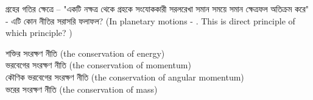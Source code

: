 \documentclass[addpoints]{exam}
\begin{document}
\begin{questions}
\begin{oneparchoices}
\end{oneparchoices}

\question  গ্রহের গতির ক্ষেত্রে – "একটি নক্ষত্র থেকে গ্রহকে সংযোককারী সরলরেখা সমান সময়ে সমান ক্ষেত্রফল অতিক্রম করে" - এটি কোন নীতির সরাসরি ফলাফল? (In planetary motions - . This is direct principle of which principle? )

\begin{oneparchoices}
\choice শক্তির সংরক্ষণ নীতি (the conservation of energy)\\
\choice ভরবেগের সংরক্ষণ নীতি (the conservation of momentum) \\
\choice কৌণিক ভরবেগের সংরক্ষণ নীতি (the conservation of angular momentum)\\
\choice ভরের সংরক্ষণ নীতি (the conservation of mass)
\end{oneparchoices}

\end{questions}
\end{document}
